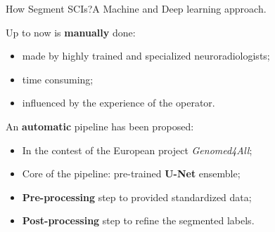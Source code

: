 \documentclass[]{standalone}
\begin{document}
	\begin{frame}{How Segment SCIs?}{A Machine and Deep learning approach.}
	\normalsize
	\vspace{-25pt}
		\begin{exampleblock}{Up to now is \textbf{manually} done:}
			\begin{itemize}
				\item made by highly trained and specialized neuroradiologists;
				\item time consuming;
				\item influenced by the experience of the operator.
			\end{itemize}
		\end{exampleblock}
		\vspace{10pt}
		\begin{block}{An \textbf{automatic} pipeline has been proposed:}
			\begin{itemize}
				\item In the contest of the European project \emph{Genomed4All};
				\item Core of the pipeline: pre-trained \textbf{U-Net} ensemble;
				\item \textbf{Pre-processing} step to provided standardized data;
				\item \textbf{Post-processing} step to refine the segmented labels.
			\end{itemize}
		\end{block}	
	\end{frame}
\end{document}

